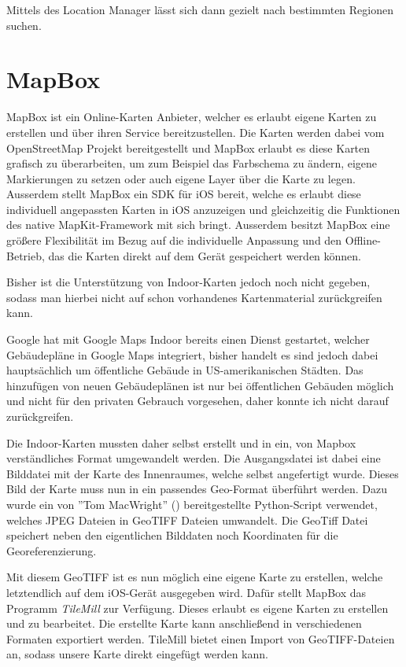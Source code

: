 Mittels des Location Manager lässt sich dann gezielt nach bestimmten Regionen suchen.


\section{MapBox}
\label{sec:sec:technologies:mapbox}
MapBox ist ein Online-Karten Anbieter, welcher es erlaubt eigene Karten zu erstellen und über ihren Service bereitzustellen. 
Die Karten werden dabei vom OpenStreetMap Projekt bereitgestellt und MapBox erlaubt es diese Karten grafisch zu überarbeiten, um zum Beispiel das Farbschema zu ändern, eigene Markierungen zu setzen oder auch eigene Layer über die Karte zu legen.
Ausserdem stellt MapBox ein SDK für iOS bereit, welche es erlaubt diese individuell angepassten Karten in iOS anzuzeigen und gleichzeitig die Funktionen des native MapKit-Framework mit sich bringt. Ausserdem besitzt MapBox eine größere Flexibilität im Bezug auf die individuelle Anpassung und den Offline-Betrieb, das die Karten direkt auf dem Gerät gespeichert werden können.

Bisher ist die Unterstützung von Indoor-Karten jedoch noch nicht gegeben, sodass man hierbei nicht auf schon vorhandenes Kartenmaterial zurückgreifen kann.

Google hat mit Google Maps Indoor bereits einen Dienst gestartet, welcher Gebäudepläne in Google Maps integriert, bisher handelt es sind jedoch dabei hauptsächlich um öffentliche Gebäude in US-amerikanischen Städten. Das hinzufügen von neuen Gebäudeplänen ist nur bei öffentlichen Gebäuden möglich und nicht für den privaten Gebrauch vorgesehen, daher konnte ich nicht darauf zurückgreifen.

Die Indoor-Karten mussten daher selbst erstellt und in ein, von Mapbox verständliches Format umgewandelt werden.
Die Ausgangsdatei ist dabei eine Bilddatei mit der Karte des Innenraumes, welche selbst angefertigt wurde. Dieses Bild der Karte muss nun in ein passendes Geo-Format überführt werden. 
Dazu wurde ein von ''Tom MacWright'' (\citet{jpgtogeo}) bereitgestellte Python-Script verwendet, welches JPEG Dateien in GeoTIFF Dateien umwandelt. Die GeoTiff Datei speichert neben den eigentlichen Bilddaten noch Koordinaten für die Georeferenzierung. \citet{geotiff}

Mit diesem GeoTIFF ist es nun möglich eine eigene Karte zu erstellen, welche letztendlich auf dem iOS-Gerät ausgegeben wird.
Dafür stellt MapBox das Programm \emph{TileMill} zur Verfügung. Dieses erlaubt es eigene Karten zu erstellen und zu bearbeitet. Die erstellte Karte kann anschließend in verschiedenen Formaten exportiert werden. 
TileMill bietet einen Import von GeoTIFF-Dateien an, sodass unsere Karte direkt eingefügt werden kann.

